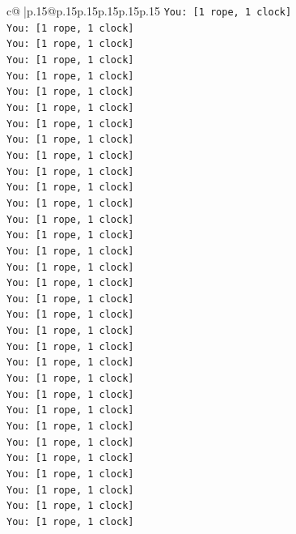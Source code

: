\documentclass{article}
\begin{document}
{\begin{supertabular}{c@{$\;$}|p{.15\linewidth}@{}p{.15\linewidth}p{.15\linewidth}p{.15\linewidth}p{.15\linewidth}p{.15\linewidth}}
{{{\texttt{You: {[}1 rope, 1 clock{]}} \\
\texttt{You: {[}1 rope, 1 clock{]}} \\
\texttt{You: {[}1 rope, 1 clock{]}} \\
\texttt{You: {[}1 rope, 1 clock{]}} \\
\texttt{You: {[}1 rope, 1 clock{]}} \\
\texttt{You: {[}1 rope, 1 clock{]}} \\
\texttt{You: {[}1 rope, 1 clock{]}} \\
\texttt{You: {[}1 rope, 1 clock{]}} \\
\texttt{You: {[}1 rope, 1 clock{]}} \\
\texttt{You: {[}1 rope, 1 clock{]}} \\
\texttt{You: {[}1 rope, 1 clock{]}} \\
\texttt{You: {[}1 rope, 1 clock{]}} \\
\texttt{You: {[}1 rope, 1 clock{]}} \\
\texttt{You: {[}1 rope, 1 clock{]}} \\
\texttt{You: {[}1 rope, 1 clock{]}} \\
\texttt{You: {[}1 rope, 1 clock{]}} \\
\texttt{You: {[}1 rope, 1 clock{]}} \\
\texttt{You: {[}1 rope, 1 clock{]}} \\
\texttt{You: {[}1 rope, 1 clock{]}} \\
\texttt{You: {[}1 rope, 1 clock{]}} \\
\texttt{You: {[}1 rope, 1 clock{]}} \\
\texttt{You: {[}1 rope, 1 clock{]}} \\
\texttt{You: {[}1 rope, 1 clock{]}} \\
\texttt{You: {[}1 rope, 1 clock{]}} \\
\texttt{You: {[}1 rope, 1 clock{]}} \\
\texttt{You: {[}1 rope, 1 clock{]}} \\
\texttt{You: {[}1 rope, 1 clock{]}} \\
\texttt{You: {[}1 rope, 1 clock{]}} \\
\texttt{You: {[}1 rope, 1 clock{]}} \\
\texttt{You: {[}1 rope, 1 clock{]}} \\
\texttt{You: {[}1 rope, 1 clock{]}} \\
\texttt{You: {[}1 rope, 1 clock{]}} \\
\texttt{You: {[}1 rope, 1 clock{]}} \\
}}}
\end{supertabular}}
\end{document}

